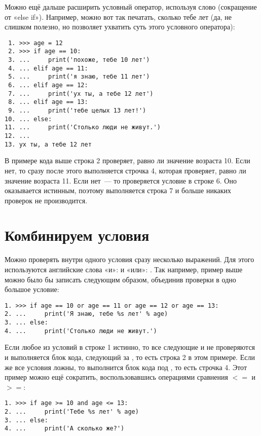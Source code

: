 Можно ещё дальше расширить условный оператор, используя слово  (сокращение от «else if»). Например, можно вот так печатать, сколько тебе лет (да, не слишком полезно, но позволяет ухватить суть этого условного оператора):

\begin{listing}
\begin{verbatim}
 1. >>> age = 12
 2. >>> if age == 10:
 3. ...     print('похоже, тебе 10 лет')
 4. ... elif age == 11:
 5. ...     print('я знаю, тебе 11 лет')
 6. ... elif age == 12:
 7. ...     print('ух ты, а тебе 12 лет')
 8. ... elif age == 13:
 9. ...     print('тебе целых 13 лет!')
10. ... else:
11. ...     print('Столько люди не живут.')
12. ...
13. ух ты, а тебе 12 лет
\end{verbatim}
\end{listing}

В примере кода выше строка 2 проверяет, равно ли значение возраста 10. Если нет, то сразу после этого выполняется строчка 4, которая проверяет, равно ли значение возраста 11. Если нет — то проверяется условие в строке 6. Оно оказывается истинным, поэтому выполняется строка 7 и больше никаких проверок не производится.

\section{Комбинируем условия}
Можно проверять внутри одного условия сразу несколько выражений. Для этого используются английские слова «и»:  и «или»: . Так например, пример выше можно было бы записать следующим образом, объединив проверки в одно большое условие:

\begin{listing}
\begin{verbatim}
1. >>> if age == 10 or age == 11 or age == 12 or age == 13:
2. ...     print('Я знаю, тебе %s лет' % age)
3. ... else:
4. ...     print('Столько люди не живут.')
\end{verbatim}
\end{listing}

Если любое из условий в строке 1 истинно, то все следующие и не проверяются и выполняется блок кода, следующий за , то есть строка 2 в этом примере. Если же все условия ложны, то выполнится блок кода под , то есть строчка 4. Этот пример можно ещё сократить, воспользовавшись операциями сравнения $<=$ и $>=$:

\begin{listing}
\begin{verbatim}
1. >>> if age >= 10 and age <= 13:
2. ...     print('Тебе %s лет' % age)
3. ... else:
4. ...     print('А сколько же?')
\end{verbatim}
\end{listing}

